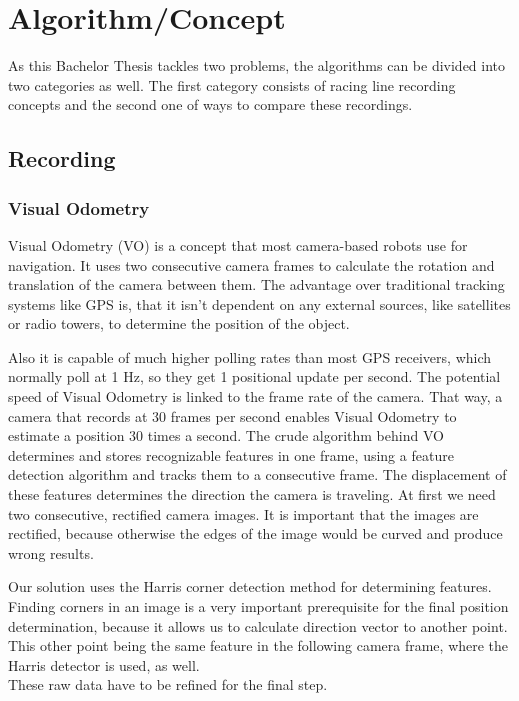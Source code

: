 \section{Algorithm/Concept}
\label{sec:algorithm}
\graphicspath{{utils/}}
As this Bachelor Thesis tackles two problems, the algorithms can be divided into two categories as well.
The first category consists of racing line recording concepts and the second one of ways to compare these recordings.

\subsection{Recording}
\subsubsection{Visual Odometry}
\label{subsec:vo}
Visual Odometry (VO) is a concept that most camera-based robots use for navigation. It uses two consecutive camera frames to calculate the rotation and translation of the camera between them. The advantage over traditional tracking systems like GPS is, that it isn't dependent on any external sources, like satellites or radio towers, to determine the position of the object.

Also it is capable of much higher polling rates than most GPS receivers, which normally poll at 1 Hz, so they get 1 positional update per second. The potential speed of Visual Odometry is linked to the frame rate of the camera. That way, a camera that records at 30 frames per second enables Visual Odometry to estimate a position 30 times a second. 
The crude algorithm behind VO determines and stores recognizable features in one frame, using a feature detection algorithm and tracks them to a consecutive frame. The displacement of these features determines the direction the camera is traveling.
At first we need two consecutive, rectified camera images. It is important that the images are rectified, because otherwise the edges of the image would be curved and produce wrong results.

Our solution uses the Harris corner detection method for determining features. Finding corners in an image is a very important prerequisite for the final position determination, because it allows us to calculate direction vector to another point. This other point being the same feature in the following camera frame, where the Harris detector is used, as well.\\
These raw data have to be refined for the final step.

